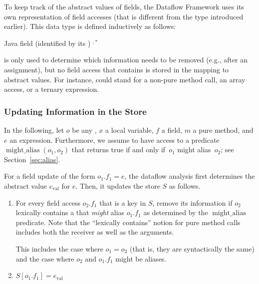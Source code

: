 To keep track of the abstract values of fields, the Dataflow Framework
uses its own representation of field accesses (that is different from
the  type introduced earlier).  This data type is defined
inductively as follows:

\begin{bnfgrammar}
        {  \qquad Java field (identified by its )}
        { \qquad {}}
        {  
            \literal{(} $^{,*}$ \literal{)}}
\end{bnfgrammar}

 is only used to determine which
information needs to be removed (e.g., after an assignment), but no field
access that contains  is stored in the mapping to
abstract values.  For instance,  could stand for
a non-pure method call, an array access, or a ternary expression.


\subsubsection{Updating Information in the Store}

\newcommand{\alias}{\operatorname{might\_alias}}

In the following, let $o$ be any , $x$ a local
variable, $f$ a field, $m$ a pure method, and $e$ an expression.
Furthermore, we assume to have access to a predicate $\alias(o_1,o_2)$
that returns true if and only if~$o_1$ might alias~$o_2$; see
Section~\ref{sec:alias}.


For a field update of the form $o_1.f_1 = e$, the
dataflow analysis first determines the abstract value $e_\text{val}$ for $e$.
Then, it updates the store $S$ as follows.
\begin{enumerate}
    \item For every field access $o_2.f_1$ that is a key in $S$, remove its
      information if
      $o_2$ lexically contains a  that \emph{might}
        alias $o_1.f_1$ as determined by the $\alias$
        predicate.
      Note that the ``lexically contains'' notion for pure method calls
        includes both the receiver as well as the arguments.

      This includes the case where $o_1 = o_2$ (that is, they are
      syntactically the same) and the case where $o_2$ and $o_1.f_1$ might be
      aliases.

    \item $S[o_1.f_1] = e_\text{val}$
\end{enumerate}


